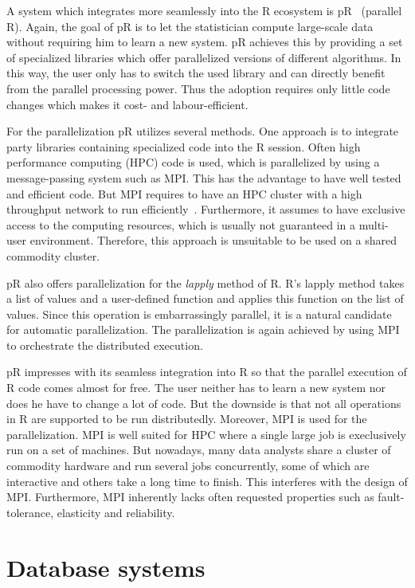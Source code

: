 A system which integrates more seamlessly into the R ecosystem is pR~\cite{samatova:2009a} (parallel R).
Again, the goal of pR is to let the statistician compute large-scale data without requiring him to learn a new system.
pR achieves this by providing a set of specialized libraries which offer parallelized versions of different algorithms.
In this way, the user only has to switch the used library and can directly benefit from the parallel processing power.
Thus the adoption requires only little code changes which makes it cost- and labour-efficient.

For the parallelization pR utilizes several methods.
One approach is to integrate  party libraries containing specialized code into the R session.
Often high performance computing (HPC) code is used, which is parallelized by using a message-passing system such as MPI.
This has the advantage to have well tested and efficient code.
But MPI requires to have an HPC cluster with a high throughput network to run efficiently~\cite{sur:2006a}.
Furthermore, it assumes to have exclusive access to the computing resources, which is usually not guaranteed in a multi-user environment.
Therefore, this approach is unsuitable to be used on a shared commodity cluster.

pR also offers parallelization for the \emph{lapply} method of R.
R's lapply method takes a list of values and a user-defined function and applies this function on the list of values.
Since this operation is embarrassingly parallel, it is a natural candidate for automatic parallelization.
The parallelization is again achieved by using MPI to orchestrate the distributed execution.

pR impresses with its seamless integration into R so that the parallel execution of R code comes almost for free.
The user neither has to learn a new system nor does he have to change a lot of code.
But the downside is that not all operations in R are supported to be run distributedly.
Moreover, MPI is used for the parallelization.
MPI is well suited for HPC where a single large job is execlusively run on a set of machines.
But nowadays, many data analysts share a cluster of commodity hardware and run several jobs concurrently, some of which are interactive and others take a long time to finish.
This interferes with the design of MPI.
Furthermore, MPI inherently lacks often requested properties such as fault-tolerance, elasticity and reliability.

\section{Database systems}

